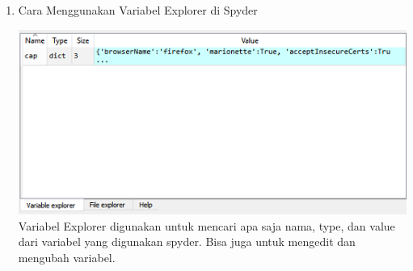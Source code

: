 \begin{enumerate}
\item Cara Menggunakan Variabel Explorer di Spyder

\includegraphics{gambar/var.png}
Variabel Explorer digunakan untuk mencari apa saja nama, type, dan value dari variabel yang digunakan spyder. Bisa juga untuk mengedit dan mengubah variabel.\\
\end{enumerate}


